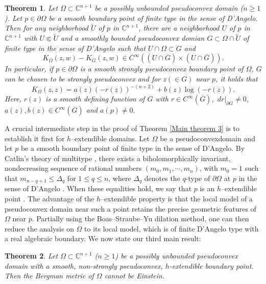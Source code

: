 \documentclass[a4paper,centertags,oneside,12pt]{amsart}
\newcommand{\p}{\partial}
\newcommand{\CC}{\mathbb C}
\newtheorem{theorem}{Theorem}[section]
\numberwithin{equation}{section}
\begin{document}
\begin{theorem}\label{Main theorem 1}
Let $\Omega\subset\mathbb C^{n+1}$ be a possibly unbounded pseudoconvex domain ($n\ge 1$).
Let $p\in \p\Omega$ be a smooth boundary point of finite type in the sense of D'Angelo. Then for any neighborhood $\widetilde{U}$ of $p$ in $\CC^{n+1}$, there are a neighborhood $U$ of $p$ in $\CC^{n+1}$ with $ U\Subset \widetilde{U}$ and a smoothly bounded pseudoconvex domian $G\subset \Omega\cap \widetilde{U}$ of finite type in the sense of D'Angelo  such that $U\cap \Omega\subset  G$ and 
$$K_{\Omega}(z, w)-K_{G}(z, w)\in C^\infty((U\cap\overline G)\times (U\cap\overline G)).$$
In particular, if $p\in \p\Omega$ is  a smooth strongly pseudoconvex boundary  point of $\Omega$,  $G$ can be chosen to be strongly pseudoconvex and for $z(\in  G)$ near $p$, it holds that 
$$K_{\Omega}(z,z) = a(z)(-r(z))^{-(n+2)} + b(z)\log(-r(z)).$$
Here, $r(z)$ is a smooth defining function of $G$ with 
$r\in C^{\infty}(\overline G)$,\ $dr|_{\p G}\not =0$,  
$a(z), b(z)\in C^\infty(\overline G)$ and  $a(p)\not = 0.$
\end{theorem}


A crucial intermediate step in the proof of Theorem \ref{Main theorem 3} is to establish it first for  $h$--extendible domains. Let $\Omega$ be a  pseudoconvexdomain and let $p$ be a smooth boundary point of finite type in the sense of D’Angelo. By Catlin’s theory of multitype \cite{Ca84}, there exists a biholomorphically invariant, nondecreasing sequence of rational numbers $(m_0, m_1, \cdots, m_n)$, with  $m_0=1$ such that $m_{n-q+1}\leq\Delta_q$ for $1\leq q\leq n$, where  $\Delta_q$ denotes the $q$-type of  $\p\Omega$ at $p$ in the sense of D’Angelo \cite{D82}. When these equalities hold, we say that  $p$ is an $h$--extendible point \cite{Yu93, BSY95}. The advantage of the $h$--extendible property is that the local model of a pseudoconvex domain near such a point retains the precise geometric features of $\Omega$  near $p$. Partially using the Boas--Straube--Yu \cite{BSY95} dilation method, one can then reduce the analysis on $\Omega$ to its local model, which is of finite D’Angelo type with a real algebraic boundary. We  now state our third main  result:


\begin{theorem}\label{Main theorem 2}
Let \(\Omega \subset \mathbb{C}^{n+1}\) (\(n \geq 1\)) be a possibly unbounded pseudoconvex domain with a smooth, non-strongly pseudoconvex, \(h\)-extendible boundary point. Then the Bergman metric of \(\Omega\) cannot be Einstein. 
\end{theorem}
\end{document}
